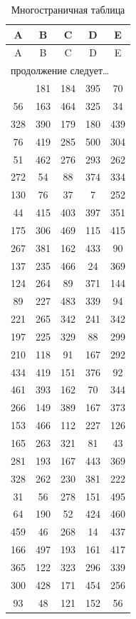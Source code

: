 \documentclass[a4paper,12pt]{article}
\begin{document}
\begin{longtable}{|c|c|c|c|c|}
  \caption{Многостраничная таблица}\\
  \hline
  \textbf{A} & \textbf{B} & \textbf{C} & \textbf{D} & \textbf{E} \\
  \hline
  \endfirsthead
  \hline
  A & B & C & D & E \\
  \hline
  \endhead
  \multicolumn{5}{l}{продолжение следует\ldots} \\
  \endfoot
  \hline
  \endlastfoot
  426 & 181 & 184 & 395 & 70 \\
  56 & 163 & 464 & 325 & 34 \\
  328 & 390 & 179 & 180 & 439 \\
  76 & 419 & 285 & 500 & 304 \\
  51 & 462 & 276 & 293 & 262 \\
  272 & 54 & 88 & 374 & 334 \\
  130 & 76 & 37 & 7 & 252 \\
  44 & 415 & 403 & 397 & 351 \\
  175 & 306 & 469 & 115 & 415 \\
  267 & 381 & 162 & 433 & 90 \\
  137 & 235 & 466 & 24 & 369 \\
  124 & 264 & 89 & 371 & 144 \\
  89 & 227 & 483 & 339 & 94 \\
  221 & 265 & 342 & 241 & 342 \\
  197 & 225 & 329 & 88 & 299 \\
  210 & 118 & 91 & 167 & 292 \\
  434 & 419 & 151 & 376 & 92 \\
  461 & 393 & 162 & 70 & 344 \\
  266 & 149 & 389 & 167 & 373 \\
  153 & 466 & 112 & 227 & 126 \\
  165 & 263 & 321 & 81 & 43 \\
  281 & 193 & 167 & 443 & 369 \\
  328 & 262 & 230 & 381 & 222 \\
  31 & 56 & 278 & 151 & 495 \\
  64 & 190 & 52 & 424 & 460 \\
  459 & 46 & 268 & 14 & 437 \\
  166 & 497 & 193 & 161 & 417 \\
  365 & 122 & 323 & 296 & 339 \\
  300 & 428 & 171 & 454 & 256 \\
  93 & 48 & 121 & 152 & 56 \\

\end{longtable}
\end{document}
